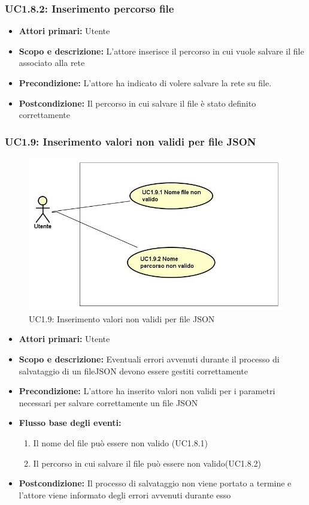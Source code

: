 \subsubsection{UC1.8.2: Inserimento percorso file} 
\begin{itemize} 
	\item{\textbf{Attori primari:} Utente} 
	\item{\textbf{Scopo e descrizione:} L'attore inserisce il percorso in cui vuole salvare il file associato alla rete} 
	\item{\textbf{Precondizione:} L'attore ha indicato di volere salvare la rete su file.} 
	\item{\textbf{Postcondizione:} Il percorso in cui salvare il file è stato definito correttamente} 
\end{itemize} 
\subsubsection{UC1.9: Inserimento valori non validi per file JSON} 
\begin{figure} [H]
	\centering
	\includegraphics[scale=0.45]{Img/UC1-9} 
	\caption{UC1.9: Inserimento valori non validi per file JSON} \label{} 
\end{figure} 
\begin{itemize} 
	\item{\textbf{Attori primari:} Utente} 
	\item{\textbf{Scopo e descrizione:} Eventuali errori avvenuti durante il processo di salvataggio di un fileJSON devono essere gestiti correttamente} 
	\item{\textbf{Precondizione:} L'attore ha inserito valori non validi per i parametri necessari per salvare correttamente un file JSON} 
	\item{\textbf{Flusso base degli eventi:} } 
	\begin{enumerate} 
		\item{Il nome del file può essere non valido (UC1.8.1)} 
		\item{Il percorso in cui salvare il file può essere non valido(UC1.8.2)} 
	\end{enumerate} 
	\item{\textbf{Postcondizione:} Il processo di salvataggio non viene portato a termine e l'attore viene informato degli errori avvenuti durante esso} 
\end{itemize} 
